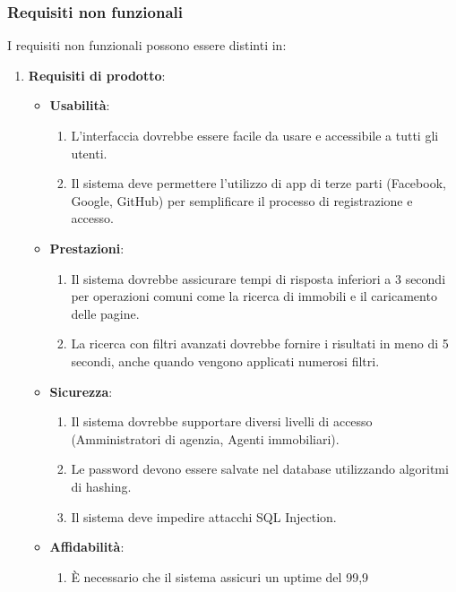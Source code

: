 \documentclass{article}
\begin{document}
\subsubsection{Requisiti non funzionali}
I requisiti non funzionali possono essere distinti in:\begin{enumerate}

    \item \textbf{Requisiti di prodotto}:\begin{itemize}
              \item \textbf{Usabilità}: \begin{enumerate}
                        \item L'interfaccia dovrebbe essere facile da usare e accessibile a tutti gli utenti.
                        \item Il sistema deve permettere l'utilizzo di app di terze parti (Facebook, Google, GitHub) per semplificare il processo di registrazione e accesso.
                    \end{enumerate}
              \item \textbf{Prestazioni}: \begin{enumerate}
                        \item Il sistema dovrebbe assicurare tempi di risposta inferiori a 3 secondi per operazioni comuni come la ricerca di immobili e il caricamento delle pagine.
                        \item La ricerca con filtri avanzati dovrebbe fornire i risultati in meno di 5 secondi, anche quando vengono applicati numerosi filtri.
                    \end{enumerate}
              \item \textbf{Sicurezza}: \begin{enumerate}
                        \item Il sistema dovrebbe supportare diversi livelli di accesso (Amministratori di agenzia, Agenti immobiliari).
                        \item Le password devono essere salvate nel database utilizzando algoritmi di hashing.
                        \item Il sistema deve impedire attacchi SQL Injection.
                    \end{enumerate}
              \item \textbf{Affidabilità}: \begin{enumerate}
                        \item È necessario che il sistema assicuri un uptime del 99,9%

\end{enumerate}
\end{itemize}
\end{enumerate}
\end{document}
